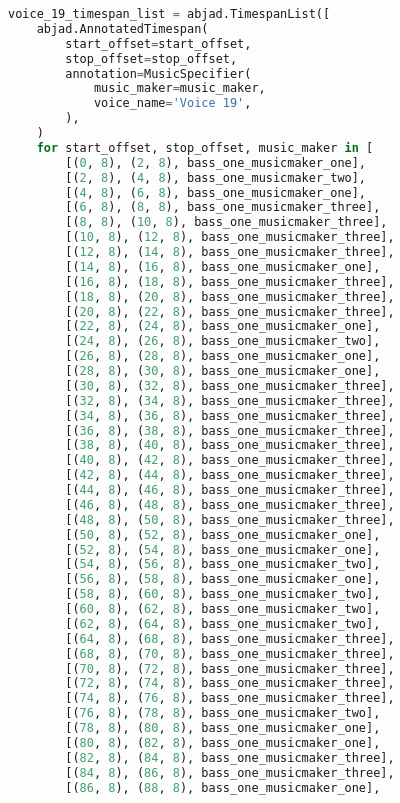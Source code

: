 \begin{lstlisting}[language=Python, caption=Invocation Source Code]
voice_19_timespan_list = abjad.TimespanList([
    abjad.AnnotatedTimespan(
        start_offset=start_offset,
        stop_offset=stop_offset,
        annotation=MusicSpecifier(
            music_maker=music_maker,
            voice_name='Voice 19',
        ),
    )
    for start_offset, stop_offset, music_maker in [
        [(0, 8), (2, 8), bass_one_musicmaker_one],
        [(2, 8), (4, 8), bass_one_musicmaker_two],
        [(4, 8), (6, 8), bass_one_musicmaker_one],
        [(6, 8), (8, 8), bass_one_musicmaker_three],
        [(8, 8), (10, 8), bass_one_musicmaker_three],
        [(10, 8), (12, 8), bass_one_musicmaker_three],
        [(12, 8), (14, 8), bass_one_musicmaker_three],
        [(14, 8), (16, 8), bass_one_musicmaker_one],
        [(16, 8), (18, 8), bass_one_musicmaker_three],
        [(18, 8), (20, 8), bass_one_musicmaker_three],
        [(20, 8), (22, 8), bass_one_musicmaker_three],
        [(22, 8), (24, 8), bass_one_musicmaker_one],
        [(24, 8), (26, 8), bass_one_musicmaker_two],
        [(26, 8), (28, 8), bass_one_musicmaker_one],
        [(28, 8), (30, 8), bass_one_musicmaker_one],
        [(30, 8), (32, 8), bass_one_musicmaker_three],
        [(32, 8), (34, 8), bass_one_musicmaker_three],
        [(34, 8), (36, 8), bass_one_musicmaker_three],
        [(36, 8), (38, 8), bass_one_musicmaker_three],
        [(38, 8), (40, 8), bass_one_musicmaker_three],
        [(40, 8), (42, 8), bass_one_musicmaker_three],
        [(42, 8), (44, 8), bass_one_musicmaker_three],
        [(44, 8), (46, 8), bass_one_musicmaker_three],
        [(46, 8), (48, 8), bass_one_musicmaker_three],
        [(48, 8), (50, 8), bass_one_musicmaker_three],
        [(50, 8), (52, 8), bass_one_musicmaker_one],
        [(52, 8), (54, 8), bass_one_musicmaker_one],
        [(54, 8), (56, 8), bass_one_musicmaker_two],
        [(56, 8), (58, 8), bass_one_musicmaker_one],
        [(58, 8), (60, 8), bass_one_musicmaker_two],
        [(60, 8), (62, 8), bass_one_musicmaker_two],
        [(62, 8), (64, 8), bass_one_musicmaker_two],
        [(64, 8), (68, 8), bass_one_musicmaker_three],
        [(68, 8), (70, 8), bass_one_musicmaker_three],
        [(70, 8), (72, 8), bass_one_musicmaker_three],
        [(72, 8), (74, 8), bass_one_musicmaker_three],
        [(74, 8), (76, 8), bass_one_musicmaker_three],
        [(76, 8), (78, 8), bass_one_musicmaker_two],
        [(78, 8), (80, 8), bass_one_musicmaker_one],
        [(80, 8), (82, 8), bass_one_musicmaker_one],
        [(82, 8), (84, 8), bass_one_musicmaker_three],
        [(84, 8), (86, 8), bass_one_musicmaker_three],
        [(86, 8), (88, 8), bass_one_musicmaker_one],

\end{lstlisting}
